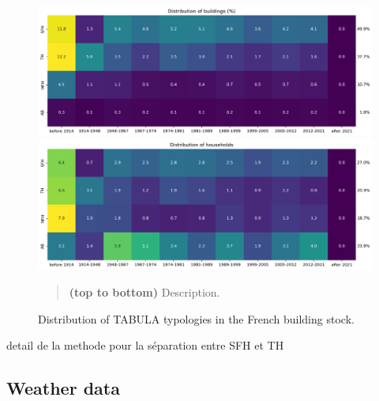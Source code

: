 \documentclass[11pt]{article}
\begin{document}
        \begin{figure}[ht]
            \centering
            \includegraphics[width=0.99\columnwidth]{figures/bgc_distribution_tabula_buildings_ponderated.png}\\
            \includegraphics[width=0.99\columnwidth]{figures/bgc_distribution_tabula_households_ponderated.png}
            \caption{\label{fig:tab_stock} Distribution of TABULA typologies in the French building stock.}
            \begin{quote}
                \vspace{-2mm}
                \small\noindent
                \textbf{(top to bottom)} Description.  
              \end{quote}
        \end{figure}

        detail de la methode pour la séparation entre SFH et TH

        






    


    \clearpage
    \subsection{Weather data} %
    \label{sub:weather_data}

        
\end{document}
